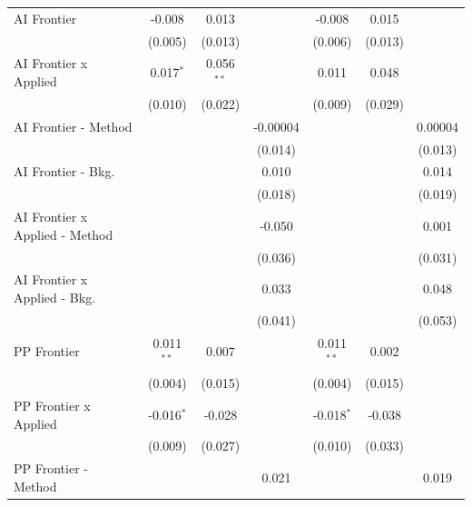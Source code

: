 \begin{tabular}{lcccccc}
   AI Frontier                    & -0.008       & 0.013        &                & -0.008       & 0.015   &   \\   
                                  & (0.005)      & (0.013)      &                & (0.006)      & (0.013) &   \\   
   AI Frontier x Applied          & 0.017$^{*}$  & 0.056$^{**}$ &                & 0.011        & 0.048   &   \\   
                                  & (0.010)      & (0.022)      &                & (0.009)      & (0.029) &   \\   
   AI Frontier - Method           &              &              & -0.00004       &              &         & 0.00004\\   
                                  &              &              & (0.014)        &              &         & (0.013)\\   
   AI Frontier - Bkg.             &              &              & 0.010          &              &         & 0.014\\   
                                  &              &              & (0.018)        &              &         & (0.019)\\   
   AI Frontier x Applied - Method &              &              & -0.050         &              &         & 0.001\\   
                                  &              &              & (0.036)        &              &         & (0.031)\\   
   AI Frontier x Applied - Bkg.   &              &              & 0.033          &              &         & 0.048\\   
                                  &              &              & (0.041)        &              &         & (0.053)\\   
   PP Frontier                    & 0.011$^{**}$ & 0.007        &                & 0.011$^{**}$ & 0.002   &   \\   
                                  & (0.004)      & (0.015)      &                & (0.004)      & (0.015) &   \\   
   PP Frontier x Applied          & -0.016$^{*}$ & -0.028       &                & -0.018$^{*}$ & -0.038  &   \\   
                                  & (0.009)      & (0.027)      &                & (0.010)      & (0.033) &   \\   
   PP Frontier - Method           &              &              & 0.021          &              &         & 0.019\\   

\end{tabular}
